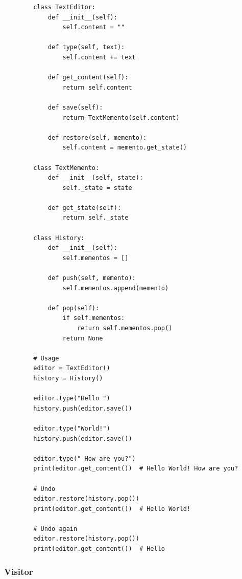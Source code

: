     \begin{example}
      \label{ex:case-study-12}
      \begin{lstlisting}
        class TextEditor:
            def __init__(self):
                self.content = ""
            
            def type(self, text):
                self.content += text
            
            def get_content(self):
                return self.content
            
            def save(self):
                return TextMemento(self.content)
            
            def restore(self, memento):
                self.content = memento.get_state()

        class TextMemento:
            def __init__(self, state):
                self._state = state
            
            def get_state(self):
                return self._state

        class History:
            def __init__(self):
                self.mementos = []
            
            def push(self, memento):
                self.mementos.append(memento)
            
            def pop(self):
                if self.mementos:
                    return self.mementos.pop()
                return None

        # Usage
        editor = TextEditor()
        history = History()

        editor.type("Hello ")
        history.push(editor.save())

        editor.type("World!")
        history.push(editor.save())

        editor.type(" How are you?")
        print(editor.get_content())  # Hello World! How are you?

        # Undo
        editor.restore(history.pop())
        print(editor.get_content())  # Hello World!

        # Undo again
        editor.restore(history.pop())
        print(editor.get_content())  # Hello 
      \end{lstlisting}
    \end{example}

  \subsubsection{Visitor}

